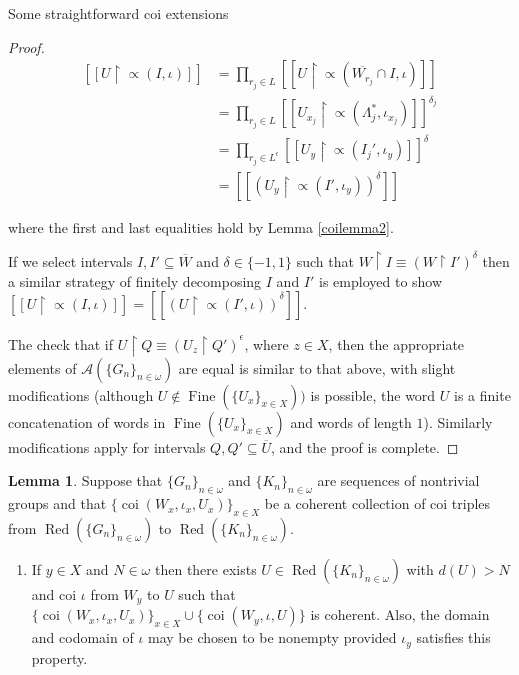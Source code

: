 \documentclass{amsart}
\theoremstyle{definition}\newtheorem{theorem}{Theorem}
\theoremstyle{definition}\newtheorem*{A}{Main Theorem}
\theoremstyle{definition}\newtheorem*{B}{Theorem \ref{elementaryequiv}}
\theoremstyle{definition}\newtheorem*{C}{Theorem \ref{continuous}}
\theoremstyle{definition}\newtheorem*{D}{Theorem \ref{bigisomorphism2}}
\theoremstyle{definition}\newtheorem{bigtheorem}{Main Theorem}
\numberwithin{theorem}{section}
\theoremstyle{definition}\newtheorem{corollary}[theorem]{Corollary}
\theoremstyle{definition}\newtheorem{proposition}[theorem]{Proposition}
\theoremstyle{definition}\newtheorem{definition}[theorem]{Definition}
\theoremstyle{definition}\newtheorem{question}[theorem]{Question}
\theoremstyle{definition}\newtheorem{example}[theorem]{Example}
\theoremstyle{definition}\newtheorem{remark}[theorem]{Remark}
\theoremstyle{definition}\newtheorem{note}[theorem]{Note}
\theoremstyle{definition}\newtheorem{lemma}[theorem]{Lemma}
\theoremstyle{definition}\newtheorem{fact}[theorem]{Fact}
\theoremstyle{definition}\newtheorem{define}[theorem]{Definition}
\theoremstyle{definition}\newtheorem{claim}[theorem]{Claim}
\theoremstyle{definition}\newtheorem{obs}[theorem]{Observation}
\theoremstyle{definition}\newtheorem{definitions}[theorem]{Definitions}
\newcommand{\Red}{\operatorname{Red}}
\newcommand{\Fine}{\operatorname{Fine}}
\newcommand{\coi}{\operatorname{coi}}
\begin{document}
\begin{section}{Some straightforward coi extensions}
\begin{proof}
$$
\begin{array}{ll}
[[U \upharpoonright \varpropto(I, \iota)]] & = \prod_{r_j\in L} [[U \upharpoonright \varpropto(\overline{W_{r_j}} \cap I, \iota)]]\\
& = \prod_{r_j \in L} [[U_{x_j} \upharpoonright \varpropto(\Lambda_j^*, \iota_{x_j})]]^{\delta_j}\\
& = \prod_{r_j \in L^{\epsilon}} [[U_{y}\upharpoonright \varpropto(I_j', \iota_y)]]^{\delta}\\
& = [[(U_y \upharpoonright \varpropto(I', \iota_y))^{\delta}]]
\end{array}
$$


\noindent where the first and last equalities hold by Lemma \ref{coilemma2}.

If we select intervals $I, I' \subseteq \overline{W}$ and $\delta \in \{-1, 1\}$ such that $W \upharpoonright I \equiv (W \upharpoonright I')^{\delta}$ then a similar strategy of finitely decomposing $I$ and $I'$ is employed to show $[[U\upharpoonright \varpropto(I, \iota)]] = [[(U\upharpoonright \varpropto(I', \iota))^{\delta}]]$.

The check that if $U \upharpoonright Q \equiv (U_z \upharpoonright Q')^{\epsilon}$, where $z\in X$, then the appropriate elements of $\mathcal{A}(\{G_n\}_{n \in \omega})$ are equal is similar to that above, with slight modifications (although $U \notin \Fine(\{U_x\}_{x\in X}))$ is possible, the word $U$ is a finite concatenation of words in $\Fine(\{U_x\}_{x \in X})$ and words of length $1$).  Similarly modifications apply for intervals $Q, Q' \subseteq \overline{U}$, and the proof is complete.
\end{proof}


\begin{lemma}\label{makeitsmaller}  Suppose that $\{G_n\}_{n \in \omega}$ and $\{K_n\}_{n \in \omega}$ are sequences of nontrivial groups and that $\{\coi(W_x, \iota_x, U_x)\}_{x\in X}$ be a coherent collection of coi triples from $\Red(\{G_n\}_{n \in \omega})$ to $\Red(\{K_n\}_{n \in \omega})$.

\begin{enumerate}


\item  If $y \in X$ and $N\in \omega$ then there exists $U \in \Red(\{K_n\}_{n \in \omega})$ with $d(U) > N$ and coi $\iota$ from $W_y$ to $U$ such that $\{\coi(W_x, \iota_x, U_x)\}_{x\in X} \cup \{\coi(W_y, \iota, U)\}$ is coherent.  Also, the domain and codomain of $\iota$ may be chosen to be nonempty provided $\iota_y$  satisfies this property.


\end{enumerate}
\end{lemma}
\end{section}
\end{document}
